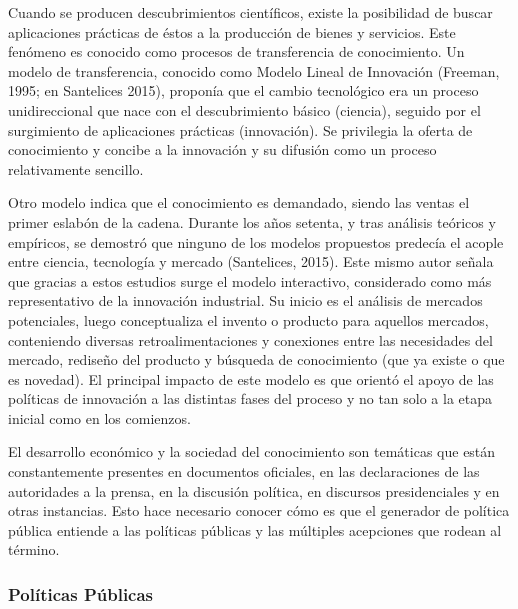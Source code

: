 \documentclass{article}
\begin{document}
Cuando se producen descubrimientos científicos, existe la posibilidad de buscar aplicaciones prácticas de éstos a la producción de bienes y servicios. Este fenómeno es conocido como procesos de transferencia de conocimiento. Un modelo de transferencia, conocido como Modelo Lineal de Innovación (Freeman, 1995; en Santelices 2015), proponía que el cambio tecnológico era un proceso unidireccional que nace con el descubrimiento básico (ciencia), seguido por el surgimiento de aplicaciones prácticas (innovación). Se privilegia la oferta de conocimiento y concibe a la innovación y su difusión como un proceso relativamente sencillo. 

Otro modelo indica que el conocimiento es demandado, siendo las ventas el primer eslabón de la cadena. Durante los años setenta, y tras análisis teóricos y empíricos, se demostró que ninguno de los modelos propuestos predecía el acople entre ciencia, tecnología y mercado (Santelices, 2015). Este mismo autor señala que gracias a estos estudios surge el modelo interactivo, considerado como más representativo de la innovación industrial. Su inicio es el análisis de mercados potenciales, luego conceptualiza el invento o producto para aquellos mercados, conteniendo diversas retroalimentaciones y conexiones entre las necesidades del mercado, rediseño del producto y búsqueda de conocimiento (que ya existe o que es novedad). El principal impacto de este modelo es que orientó el apoyo de las políticas de innovación a las distintas fases del proceso y no tan solo a la etapa inicial como en los comienzos.

El desarrollo económico y la sociedad del conocimiento son temáticas que están constantemente presentes en documentos oficiales, en las declaraciones de las autoridades a la prensa, en la discusión política, en discursos presidenciales y en otras instancias. Esto hace necesario conocer cómo es que el generador de política pública entiende a las políticas públicas y las múltiples acepciones que rodean al término.

\subsubsection{Políticas Públicas}
\end{document}
